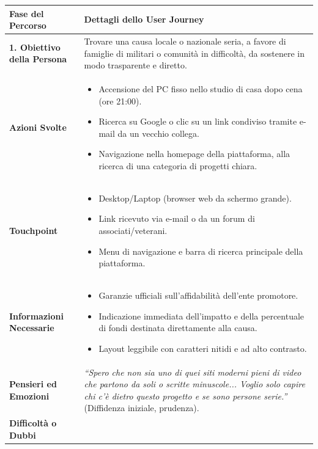 \documentclass[11pt,a4paper]{article}
\begin{document}
\begin{table}[h!]
\centering
\small
\begin{tabular}{|p{3.2cm}|p{11.8cm}|}
\hline
\textbf{Fase del Percorso} & \textbf{Dettagli dello User Journey} \\ \hline
\hline
\textbf{1. Obiettivo della Persona} & Trovare una causa locale o nazionale seria, a favore di famiglie di militari o comunità in difficoltà, da sostenere in modo trasparente e diretto. \\ \hline
\textbf{Azioni Svolte} &
\begin{itemize}[leftmargin=*,nosep]
    \item Accensione del PC fisso nello studio di casa dopo cena (ore 21:00).
    \item Ricerca su Google o clic su un link condiviso tramite e-mail da un vecchio collega.
    \item Navigazione nella homepage della piattaforma, alla ricerca di una categoria di progetti chiara.
\end{itemize} \\ \hline
\textbf{Touchpoint} &
\begin{itemize}[leftmargin=*,nosep]
    \item Desktop/Laptop (browser web da schermo grande).
    \item Link ricevuto via e-mail o da un forum di associati/veterani.
    \item Menu di navigazione e barra di ricerca principale della piattaforma.
\end{itemize} \\ \hline
\textbf{Informazioni Necessarie} &
\begin{itemize}[leftmargin=*,nosep]
    \item Garanzie ufficiali sull'affidabilità dell'ente promotore.
    \item Indicazione immediata dell'impatto e della percentuale di fondi destinata direttamente alla causa.
    \item Layout leggibile con caratteri nitidi e ad alto contrasto.
\end{itemize} \\ \hline
\textbf{Pensieri ed Emozioni} &
\textit{``Spero che non sia uno di quei siti moderni pieni di video che partono da soli o scritte minuscole... Voglio solo capire chi c'è dietro questo progetto e se sono persone serie.''} (Diffidenza iniziale, prudenza). \\ \hline
\textbf{Difficoltà o Dubbi} &
\begin{itemize}[leftmargin=*,nosep]

\end{itemize}
\end{tabular}
\end{table}
\end{document}
